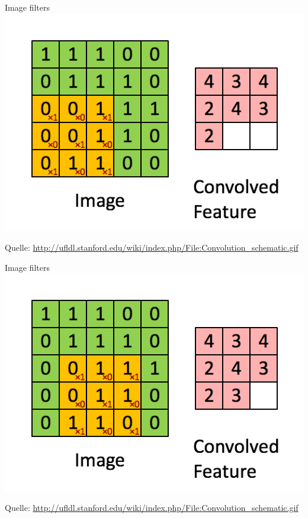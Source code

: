 \begin{frame}{Image filters}
    \includegraphics[width=\textwidth, height=0.8\textheight, keepaspectratio]{../presentation-images/image-filter-6.png}

    Quelle: \href{http://ufldl.stanford.edu/wiki/index.php/File:Convolution_schematic.gif}{http://ufldl.stanford.edu/wiki/index.php/File:Convolution\_schematic.gif}
\end{frame}

\begin{frame}{Image filters}
    \includegraphics[width=\textwidth, height=0.8\textheight, keepaspectratio]{../presentation-images/image-filter-7.png}

    Quelle: \href{http://ufldl.stanford.edu/wiki/index.php/File:Convolution_schematic.gif}{http://ufldl.stanford.edu/wiki/index.php/File:Convolution\_schematic.gif}
\end{frame}


